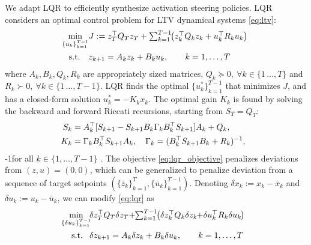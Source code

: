 \documentclass{article}
\theoremstyle{plain}
\theoremstyle{definition}
\theoremstyle{remark}
\begin{document}
We adapt LQR \cite{kalman1960contributions} to efficiently synthesize activation steering policies. LQR considers an optimal control problem for LTV dynamical systems \eqref{eq:ltv}:
\begin{subequations}\label{eq:lqr}
\begin{align}
\hspace{-7pt}\min_{\{u_k\}_{k=1}^{T-1}}
& J := z_T^\top Q_T z_T
+ \textstyle \sum_{k=1}^{T-1}\hspace{-3pt} \left( z_k^\top Q_k z_k + u_k^\top R_k u_k \right)\hspace{-4pt}
\label{eq:lqr_objective} \\
\text{s.t.} \quad 
& z_{k+1} = A_k z_k + B_k u_k, \qquad k = 1,\dots,T
\label{eq:ltv}
\end{align}
\end{subequations}
where $A_k,B_k,Q_k,R_k$ are appropriately sized matrices, $Q_k \succeq 0,\ \forall k \in \{1\,\ldots, T\}$ and $R_k \succ 0,\ \forall k \in \{1\,\ldots, T-1\}$. LQR finds the optimal $\{u^*_k\}_{k=1}^{T-1}$ that minimizes $J$, and has a closed-form solution $u^*_k = -K_kx_k$.
The optimal gain $K_k$ is found by solving the backward and forward Riccati recursions, starting from $S_T = Q_T$: 
\begin{equation}\label{ricatti}
    \begin{aligned}
        \hspace{-6pt}S_k &= A_k^\top[S_{k+1} - S_{k+1}B_k\Gamma_kB_k^\top S_{k+1}]A_k + Q_k,\\
        \hspace{-6pt}K_k &= \Gamma_k B_k^\top S_{k+1}A_k,\quad  \Gamma_k = (B_k^\top S_{k+1}B_k + R_k)^{-1},
    \end{aligned}
\end{equation}
\looseness-1for all $k \in \{1,\ldots,T-1\}$ \cite{lewisOptimalControlChapter2}. The objective \eqref{eq:lqr_objective} penalizes deviations from $(z,u) = (0,0)$, which can be generalized to penalize deviation from a sequence of target setpoints $(\{\bar z_k\}_{k=1}^T, \{\bar u_k\}_{k=1}^{T-1})$. Denoting $\delta x_k := x_k - \bar x_k$ and $\delta u_k := u_k - \bar u_k$, we can modify \eqref{eq:lqr} as
\begin{subequations}\label{eq:lqr_tracking}
\begin{align}
\hspace{-9pt}\min_{\{\delta u_k\}_{k=1}^{T-1}}
& \hspace{-2pt}\delta z_T^\top Q_T \delta z_T\hspace{-2pt}
+ \hspace{-3pt}\textstyle\sum_{k=1}^{T-1}\hspace{-3pt} \left( \delta z_k^\top Q_k \delta z_k\hspace{-3pt} +\hspace{-2pt} \delta u_k^\top R_k \delta u_k \hspace{-1pt}\right)\hspace{-10pt}
\label{eq:err_lqr_objective} \\
\text{s.t.} \quad
& \hspace{-2pt}\delta z_{k+1} = A_k \delta z_k + B_k \delta u_k, \qquad k = 1,\dots,T
\label{eq:err_ltv}
\end{align}
\end{subequations}
\end{document}
